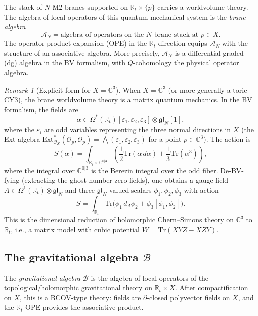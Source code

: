 \documentclass[11pt]{article}
\theoremstyle{definition}
\theoremstyle{remark}
\newtheorem{remark}[theorem]{Remark}
\newcommand{\Ext}{\mathrm{Ext}}
\newcommand{\Tr}{\mathrm{Tr}}
\newcommand{\cA}{\mathcal{A}}
\newcommand{\cB}{\mathcal{B}}
\newcommand{\cO}{\mathcal{O}}
\newcommand{\frakgl}{\mathfrak{gl}}
\begin{document}
The stack of $N$ M2-branes supported on $\mathbb{R}_t \times \{p\}$ carries a
worldvolume theory. The algebra of local operators of this quantum-mechanical
system is the \emph{brane algebra}
\[
 \cA_N = \text{algebra of operators on the $N$-brane stack at $p \in X$}.
\]
The operator product expansion (OPE) in the $\mathbb{R}_t$ direction equips
$\cA_N$ with the structure of an associative algebra. More precisely, $\cA_N$
is a differential graded (dg) algebra in the BV formalism, with $Q$-cohomology
the physical operator algebra.

\begin{remark}[Explicit form for $X = \mathbb{C}^3$]
\label{rem:c3-explicit}
When $X = \mathbb{C}^3$ (or more generally a toric CY3), the brane worldvolume
theory is a matrix quantum mechanics. In the BV formalism, the fields are
\[
 \alpha \in \Omega^*(\mathbb{R}_t)[\varepsilon_1, \varepsilon_2, \varepsilon_3]
 \otimes \frakgl_N[1],
\]
where the $\varepsilon_i$ are odd variables representing the three normal
directions in $X$ (the Ext algebra $\Ext^*_{\cO_X}(\cO_p, \cO_p) =
\bigwedge(\varepsilon_1, \varepsilon_2, \varepsilon_3)$ for a point $p \in
\mathbb{C}^3$). The action is
\[
 S(\alpha) = \int_{\mathbb{R}_t \times \mathbb{C}^{0|3}}
 \left( \frac{1}{2} \Tr(\alpha \, d\alpha)
 + \frac{1}{3} \Tr(\alpha^3) \right),
\]
where the integral over $\mathbb{C}^{0|3}$ is the Berezin integral over the
odd fiber. De-BV-fying (extracting the ghost-number-zero fields), one obtains
a gauge field $A \in \Omega^1(\mathbb{R}_t) \otimes \frakgl_N$ and three
$\frakgl_N$-valued scalars $\phi_1, \phi_2, \phi_3$ with action
\[
 S = \int_{\mathbb{R}_t} \Tr\bigl(
 \phi_1 \, d_A \phi_2
 + \phi_3 [\phi_1, \phi_2]
 \bigr).
\]
This is the dimensional reduction of holomorphic Chern--Simons theory on
$\mathbb{C}^3$ to $\mathbb{R}_t$, i.e., a matrix model with cubic potential
$W = \Tr(XYZ - XZY)$.
\end{remark}

\subsection{The gravitational algebra $\cB$}

The \emph{gravitational algebra} $\cB$ is the algebra of local operators of the topological/holomorphic gravitational theory on $\mathbb{R}_t \times X$. After compactification on $X$, this is a BCOV-type theory: fields are $\partial$-closed polyvector fields on $X$, and the $\mathbb{R}_t$ OPE provides the associative product.
\end{document}

